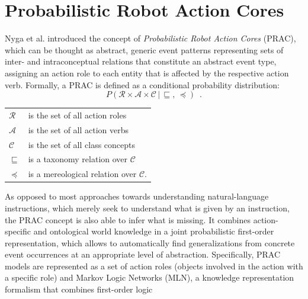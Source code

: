 \documentclass[oribibl]{llncs}
\begin{document}
\section{Probabilistic Robot Action Cores}
Nyga et al.\cite{nyga12actioncore} introduced the concept of 
\emph{Probabilistic Robot Action Cores} (PRAC), which can be thought as abstract,
generic event patterns representing sets of 
inter- and intraconceptual relations that constitute an abstract 
event type, assigning an action role to each entity that is affected 
by the respective action verb. Formally, a PRAC is defined as a conditional
probability distribution:
\begin{equation}
P\left(\mathcal{R}\times\mathcal{A}\times\mathcal{C}\,|\,\sqsubseteq
,\, \preceq \right)\nonumber \enspace .
\end{equation}
{\small
\begin{center} \begin{tabular}{ll}
    $\mathcal{R}$  & is the set of all action roles\\
    $\mathcal{A}$  & is the set of all action verbs\\
    $\mathcal{C}$  & is the set of all class concepts\\
    $\sqsubseteq$ & is a taxonomy relation over $\mathcal{C}$\\
    $\preceq$	& is a mereological relation over $\mathcal{C}$.
\end{tabular}
\end{center}}
As opposed to most approaches towards understanding natural-language 
instructions, which merely seek to understand what is given by an 
instruction, the PRAC concept is also able to infer what is missing. 
It combines action-specific and ontological world knowledge in a 
joint probabilistic first-order representation, which allows to 
automatically find generalizations from concrete event occurrences 
at an appropriate level of abstraction. Specifically, PRAC models 
are represented as a set of action roles (objects involved in the 
action with a specific role) and Markov Logic Networks (MLN), a 
knowledge representation formalism that combines first-order logic 
\end{document}
